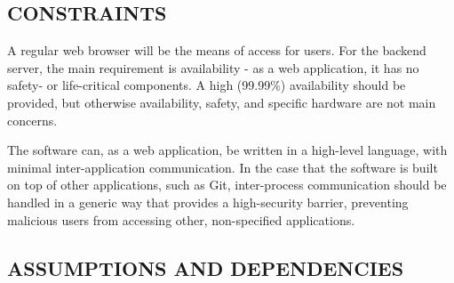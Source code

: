 \documentclass[letterpaper, 10pt, draftclsnofoot, compsoc, onecolumn]{IEEEtran}
\begin{document}

\subsection[CONSTRAINTS]{\rmfamily\bfseries\color{black}
CONSTRAINTS}

\noindent A regular web browser will be the means of access for users. For the backend
server, the main requirement is availability - as a web application, it has no
safety- or life-critical components. A high (99.99\%) availability should be provided,
but otherwise availability, safety, and specific hardware are not main concerns.

\bigskip

\noindent The software can, as a web application, be written in a high-level language, with
minimal inter-application communication. In the case that the software is built
on top of other applications, such as Git, inter-process communication should be
handled in a generic way that provides a high-security barrier, preventing malicious
users from accessing other, non-specified applications.

\subsection[ASSUMPTIONS AND DEPENDENCIES]{\rmfamily\bfseries\color{black}
ASSUMPTIONS AND DEPENDENCIES}
\end{document}
